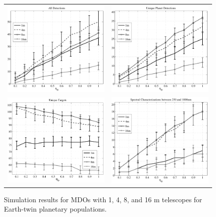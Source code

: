  \begin{figure}[ht]
 \begin{center}
  \begin{tabular}{c c}
   \includegraphics[width=2.9in]{./figures/occulters_ADETs} &
   \includegraphics[width=2.9in]{./figures/occulters_AuDETs} \\
   \includegraphics[width=2.9in]{./figures/occulters_Auvisits} &
   \includegraphics[width=2.9in]{./figures/occulters_ASPECTRA}
  \end{tabular}
 \end{center}
 \caption[MDO comparison]{ \label{fig:compMDOs} Simulation results for MDOs with 1, 4, 8, and 16 m telescopes for Earth-twin planetary populations.}
 \end{figure}
 
